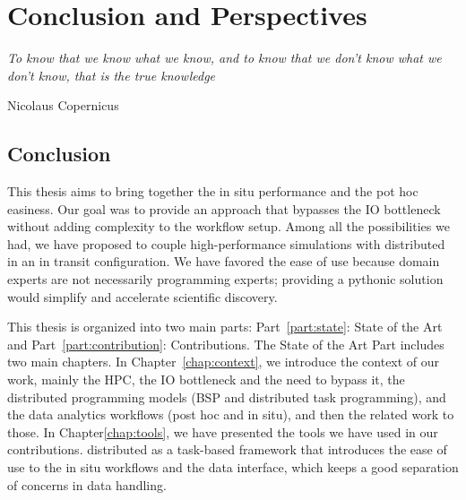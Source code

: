 \chapter{Conclusion and Perspectives}
\vspace{20mm}
\epigraph{\textit{To know that we know what we know, and to know that we don't know what we don't know, that is the true knowledge}} {Nicolaus Copernicus}


\vfill


\newpage


\section{Conclusion}


This thesis aims to bring together the in situ performance and the pot hoc easiness. 
Our goal was to provide an approach that bypasses the IO bottleneck without adding complexity to the workflow setup. 
Among all the possibilities we had, we have proposed to couple high-performance simulations with \dask distributed in an in transit configuration.   
We have favored the ease of use because domain experts are not necessarily programming experts; providing a pythonic solution would simplify and accelerate scientific discovery.   

This thesis is organized into two main parts: Part~\ref{part:state}: State of the Art and Part~\ref{part:contribution}: Contributions. 
The State of the Art Part includes two main chapters. In Chapter~\ref{chap:context}, we introduce the context of our work, mainly the HPC, the IO bottleneck and the need to bypass it, the distributed programming models (BSP and distributed task programming), and the data analytics workflows (post hoc and in situ), and then the related work to those. 
In Chapter\ref{chap:tools}, we have presented the tools we have used in our contributions. \dask distributed as a task-based framework that introduces the ease of use to the in situ workflows and the \pdi data interface, which keeps a good separation of concerns in data handling.    

